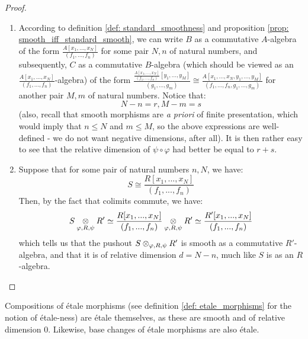                     \begin{proof}
                        \noindent
                        \begin{enumerate}
                            \item According to definition \ref{def: standard_smoothness} and proposition \ref{prop: smooth_iff_standard_smooth}, we can write $B$ as a commutative $A$-algebra of the form $\frac{A[x_1, ..., x_N]}{(f_1, ..., f_n)}$ for some pair $N, n$ of natural numbers, and subsequently, $C$ as a commutative $B$-algebra (which should be viewed as an $\frac{A[x_1, ..., x_N]}{(f_1, ..., f_n)}$-algebra) of the form $\frac{\frac{A[x_1, ..., x_N]}{(f_1, ..., f_n)}[y_1, ..., y_M]}{(g_1, ..., g_m)} \cong \frac{A[x_1, ..., x_N, y_1, ..., y_M]}{(f_1, ..., f_n, g_1, ..., g_m)}$ for another pair $M, m$ of natural numbers. Notice that:
                                $$N - n = r, M - m = s$$
                            (also, recall that smooth morphisms are \textit{a priori} of finite presentation, which would imply that $n \leq N$ and $m \leq M$, so the above expressions are well-defined - we do not want negative dimensions, after all). It is then rather easy to see that the relative dimension of $\psi \circ \varphi$ had better be equal to $r + s$.
                            \item Suppose that for some pair of natural numbers $n, N$, we have:
                                $$S \cong \frac{R[x_1, ..., x_N]}{(f_1, ..., f_n)}$$
                            Then, by the fact that colimits commute, we have:
                                $$S \tensor_{\varphi, R, \psi} R' \cong \frac{R[x_1, ..., x_N]}{(f_1, ..., f_n)} \tensor_{\varphi, R, \psi} R' \cong \frac{R'[x_1, ..., x_N]}{(f_1, ..., f_n)}$$
                            which tells us that the pushout $S \tensor_{\varphi, R, \psi} R'$ is smooth as a commutative $R'$-algebra, and that it is of relative dimension $d = N - n$, much like $S$ is as an $R$-algebra.
                        \end{enumerate}
                    \end{proof}
                \begin{corollary} \label{coro: compositions_and_base_changes_of_etale_morphisms}
                    Compositions of \'etale morphisms (see definition \ref{def: etale_morphisms} for the notion of \'etale-ness) are \'etale themselves, as these are smooth and of relative dimension $0$. Likewise, base changes of \'etale morphisms are also \'etale.
                \end{corollary}
